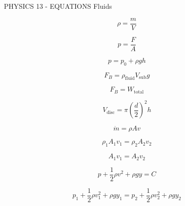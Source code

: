PHYSICS 13 - EQUATIONS
Fluids

$$\rho = \frac{m}{V}$$

$$p = \frac{F}{A}$$

$$p = p_0 + \rho g h$$

$$F_B = \rho_{\text{fluid}} V_{\text{sub}} g$$

$$F_B = W_{\text{total}}$$

$$V_{\text{disc}} = \pi\left(\frac d2\right)^2 h$$


$$\dot m=\rho Av$$

$$\rho_1A_1v_1=\rho_2A_2v_2$$

$$A_1v_1=A_2v_2$$

$$p+\frac12\rho v^2+\rho gy=C$$

$$p_1+\frac12\rho v_1^2+\rho gy_1=p_2+\frac12\rho v_2^2+\rho gy_2$$
